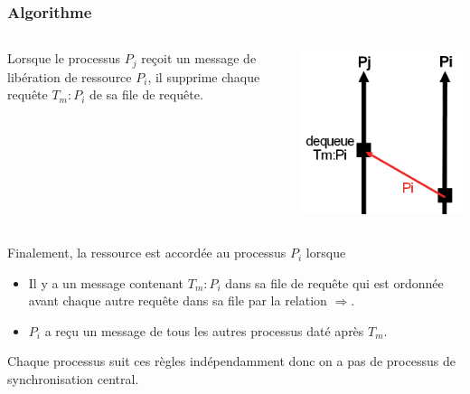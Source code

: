 \documentclass[compress]{beamer}
\begin{document}
\begin{frame}
\frametitle{Algorithme}
\begin{columns}
    	\begin{column}{.6\textwidth}
			Lorsque le processus $P_j$ reçoit un message de libération de ressource $P_i$, il supprime chaque requête $T_m : P_i$ de sa file de requête.
		\end{column}
		\begin{column}{.4\textwidth}
		\begin{center}
		\includegraphics[scale=0.5]{process11.png}
		\end{center}
	
		\end{column}
	\end{columns}
	\bigskip
	Finalement, la ressource est accordée au processus $P_i$ lorsque \bigskip
	\begin{itemize}
	\item Il y a un message contenant $T_m : P_i$ dans sa file de requête qui est ordonnée avant chaque autre requête dans sa file par la relation $\Rightarrow$.
	\item $P_i$ a reçu un message de tous les autres processus daté après $T_m$.
	\end{itemize}
	\bigskip
	{\color{cyan} Chaque processus} suit ces règles indépendamment donc on a pas de processus de synchronisation central.
\end{frame}
\end{document}
